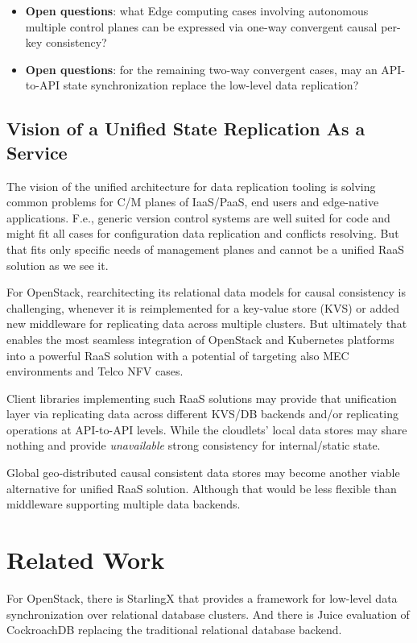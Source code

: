 \documentclass[conference]{IEEEtran}
\begin{document}
\begin{itemize}
  \item \textbf{Open questions}: what Edge computing cases involving autonomous
    multiple control planes can be expressed via one-way convergent causal
    per-key consistency?
\item \textbf{Open questions}: for the remaining two-way convergent cases,
    may an API-to-API state synchronization replace the low-level data
    replication?
\end{itemize}

\subsection{Vision of a Unified State Replication As a Service}
The vision of the unified architecture for data replication tooling is solving
common problems for C/M planes of IaaS/PaaS, end users and edge-native
applications. F.e., generic version control systems are well suited for code
and might fit all cases for configuration data replication and conflicts
resolving. But that fits only specific needs of management planes and cannot be
a unified RaaS solution as we see it.

For OpenStack, rearchitecting its relational data models for causal consistency
is challenging, whenever it is reimplemented for a key-value store (KVS) or
added new middleware for replicating data across multiple clusters. But
ultimately that enables the most seamless integration of OpenStack and
Kubernetes platforms into a powerful RaaS solution with a potential of
targeting also MEC environments and Telco NFV cases.

Client libraries implementing such RaaS solutions may provide that unification
layer via replicating data across different KVS/DB backends and/or replicating
operations at API-to-API levels. While the cloudlets' local data stores may
share nothing and provide \textit{unavailable}\cite{b4} strong consistency for
internal/static state.

Global geo-distributed causal consistent data stores may become another viable
alternative for unified RaaS solution. Although that would be less flexible
than middleware supporting multiple data backends.

\section{Related Work}
For OpenStack, there is StarlingX\cite{b24} that provides a framework for
low-level data synchronization over relational database clusters. And there is
Juice\cite{b21} evaluation of CockroachDB\cite{b22} replacing the traditional
relational database backend.
\end{document}
